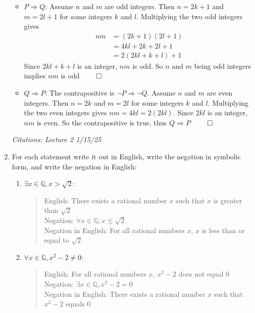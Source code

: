 \documentclass[11pt]{article}
\newcommand{\Q}{\mathbb{Q}}
\begin{document}
\begin{enumerate}
  \begin{itemize}
    \item $P \Rightarrow Q$: Assume $n$ and $m$ are odd integers. Then $n = 2k + 1$ and $m = 2l + 1$
    for some integers $k$ and $l$. Multiplying the two odd integers gives
    \begin{align*}
      nm &= (2k + 1)(2l + 1) \\
      &= 4kl + 2k + 2l + 1 \\
      &= 2(2kl + k + l) + 1
    \end{align*}
    Since $2kl + k + l$ is an integer, $nm$ is odd.
    So $n$ and $m$ being odd integers implies $nm$ is odd $\qed$

    \item $Q \Rightarrow P$: The contrapositive is $\neg P \Rightarrow \neg Q$.
    Assume $n$ and $m$ are even integers.
    Then $n = 2k$ and $m = 2l$ for some integers $k$ and $l$. Multiplying the two even integers
    gives $nm = 4kl = 2(2kl)$. Since $2kl$ is an integer, $nm$ is even. So the contrapositive 
    is true, thus $Q \Rightarrow P$ $\qed$
  \end{itemize}

  \textit{Citations: Lecture 2 1/15/25}

  \newpage
  \item For each statement write it out in English, write the negation in symbolic form, and
  write the negation in English:

  \begin{enumerate}
    \item $\exists x \in \Q, x > \sqrt 2$:
    \begin{quote}
      English: There exists a rational number $x$ such that $x$ is greater than $\sqrt 2$ \\
      Negation: $\forall x \in \Q, x \leq \sqrt 2$ \\
      Negation in English: For all rational numbers $x$, $x$ is less than or equal to $\sqrt 2$
    \end{quote}

    \item $\forall x \in \Q, x^2 - 2 \neq 0$:
    \begin{quote}
      English: For all rational numbers $x$, $x^2 - 2$ does not equal 0 \\
      Negation: $\exists x \in \Q, x^2 - 2 = 0$ \\
      Negation in English: There exists a rational number $x$ such that $x^2 - 2$ equals 0
    \end{quote}


\end{enumerate}
\end{enumerate}
\end{document}

